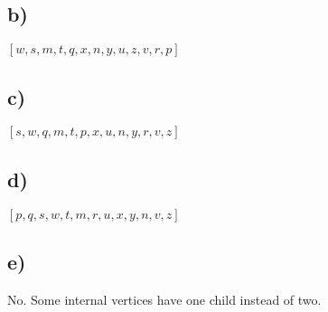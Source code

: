 \documentclass[12pt]{article}
\begin{document}
\subsection*{b)}
$[w, s, m, t, q, x, n, y, u, z, v, r, p]$

\subsection*{c)}
$[s, w, q, m, t, p, x, u, n, y, r, v, z]$

\subsection*{d)}
$[p, q, s, w, t, m, r, u, x, y, n, v, z]$

\subsection*{e)}
No. Some internal vertices have one child instead of two.
\end{document}
